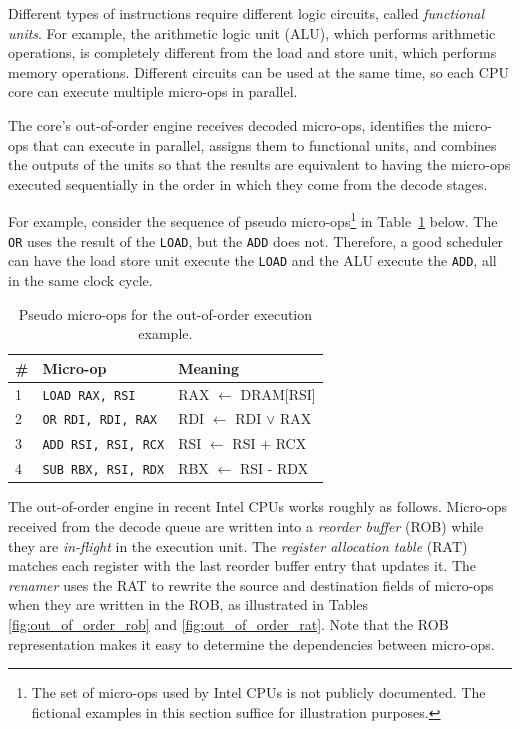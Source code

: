 
Different types of instructions require different logic circuits, called
\textit{functional units}. For example, the arithmetic logic unit (ALU), which
performs arithmetic operations, is completely different from the load and store
unit, which performs memory operations. Different circuits can be used at the
same time, so each CPU core can execute multiple micro-ops in parallel.

The core's out-of-order engine receives decoded micro-ops, identifies the
micro-ops that can execute in parallel, assigns them to functional units, and
combines the outputs of the units so that the results are equivalent to having
the micro-ops executed sequentially in the order in which they come from the
decode stages.

For example, consider the sequence of pseudo micro-ops\footnote{The set of
micro-ops used by Intel CPUs is not publicly documented. The fictional examples
in this section suffice for illustration purposes.} in
Table~\ref{fig:out_of_order_micro_ops} below. The \texttt{OR} uses the result
of the \texttt{LOAD}, but the \texttt{ADD} does not. Therefore, a good
scheduler can have the load store unit execute the \texttt{LOAD} and the ALU
execute the \texttt{ADD}, all in the same clock cycle.

\begin{table}[hbt]
  \centering
  \begin{tabular}{| l | l | l |}
  \hline
  \textbf{\#} & \textbf{Micro-op} & \textbf{Meaning}\\
  \hline
  1 & \texttt{LOAD RAX, RSI} & RAX $\leftarrow$ DRAM[RSI]\\
  \hline
  2 & \texttt{OR RDI, RDI, RAX} & RDI $\leftarrow$ RDI $\lor$ RAX\\
  \hline
  3 & \texttt{ADD RSI, RSI, RCX} & RSI $\leftarrow$ RSI + RCX\\
  \hline
  4 & \texttt{SUB RBX, RSI, RDX} & RBX $\leftarrow$ RSI - RDX\\
  \hline
  \end{tabular}
  \caption{
    Pseudo micro-ops for the out-of-order execution example.
  }
  \label{fig:out_of_order_micro_ops}
\end{table}


The out-of-order engine in recent Intel CPUs works roughly as follows.
Micro-ops received from the decode queue are written into a \textit{reorder
buffer} (ROB) while they are \textit{in-flight} in the execution unit. The
\textit{register allocation table} (RAT) matches each register with the last
reorder buffer entry that updates it. The \textit{renamer} uses the RAT to
rewrite the source and destination fields of micro-ops when they are written in
the ROB, as illustrated in Tables \ref{fig:out_of_order_rob} and
\ref{fig:out_of_order_rat}. Note that the ROB representation makes it easy to
determine the dependencies between micro-ops.

